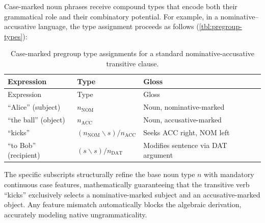 \documentclass[
]{article}
\begin{document}
Case-marked noun phrases receive compound types that encode both their
grammatical role and their combinatory potential. For example, in a
nominative--accusative language, the type assignment proceeds as follows
(\autoref{tbl:pregroup-types}):

\begin{longtable}[]{@{}
  >{\raggedright\arraybackslash}p{}
  >{\raggedright\arraybackslash}p{}
  >{\raggedright\arraybackslash}p{}@{}}
\caption{Case-marked pregroup type assignments for a standard
nominative-accusative transitive
clause.}\label{tbl:pregroup-types}\tabularnewline
\toprule\noalign{}
\begin{minipage}[b]{\linewidth}\raggedright
Expression
\end{minipage} & \begin{minipage}[b]{\linewidth}\raggedright
Type
\end{minipage} & \begin{minipage}[b]{\linewidth}\raggedright
Gloss
\end{minipage} \\
\midrule\noalign{}
\endfirsthead
\toprule\noalign{}
\begin{minipage}[b]{\linewidth}\raggedright
Expression
\end{minipage} & \begin{minipage}[b]{\linewidth}\raggedright
Type
\end{minipage} & \begin{minipage}[b]{\linewidth}\raggedright
Gloss
\end{minipage} \\
\midrule\noalign{}
\endhead
\bottomrule\noalign{}
\endlastfoot
``Alice'' (subject) & \(n_{\text{NOM}}\) & Noun, nominative-marked \\
``the ball'' (object) & \(n_{\text{ACC}}\) & Noun, accusative-marked \\
``kicks'' & \((n_{\text{NOM}} \backslash s) / n_{\text{ACC}}\) & Seeks
ACC right, NOM left \\
``to Bob'' (recipient) & \((s \backslash s) / n_{\text{DAT}}\) &
Modifies sentence via DAT argument \\
\end{longtable}

The specific subscripts structurally refine the base noun type \(n\)
with mandatory continuous case features, mathematically guaranteeing
that the transitive verb ``kicks'' exclusively selects a
nominative-marked subject and an accusative-marked object. Any feature
mismatch automatically blocks the algebraic derivation, accurately
modeling native ungrammaticality.
\end{document}
